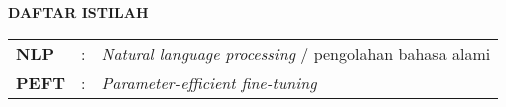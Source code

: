 \newpage
\begin{center}
    \Large \bfseries{DAFTAR ISTILAH}
    \bigskip

    \begin{table}[h]
        \begin{tabularx}{\textwidth}{lcX}
            \textbf{NLP} & : & \textit{Natural language processing} / pengolahan bahasa alami \\
            \textbf{PEFT} & : & \textit{Parameter-efficient fine-tuning} \\
        \end{tabularx}
    \end{table}
\end{center}
